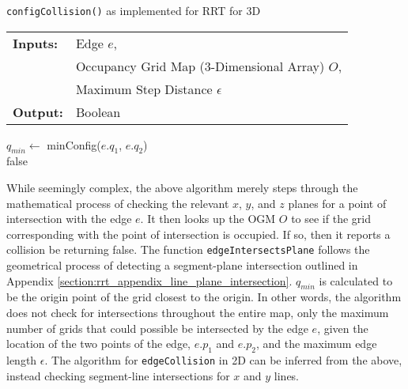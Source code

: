 \begin{algorithm}[t!]
    \caption{\texttt{configCollision()} as implemented for \gls{RRT} for 3D}
    \SetAlgoLined
    \begin{tabular}{l l}
    \textbf{Inputs:}    & Edge $e$,\\ 
                        & Occupancy Grid Map (3-Dimensional Array) $O$,\\ 
                        & Maximum Step Distance $\epsilon$ \\
    \textbf{Output:}    & Boolean \\
    \end{tabular}
    
        $q_{min} \leftarrow $ minConfig($e.q_1$, $e.q_2$) \\
        \Return false
\end{algorithm}

While seemingly complex, the above algorithm merely steps through the mathematical process of checking the relevant $x$, $y$, and $z$ planes for a point of intersection with the edge $e$. It then looks up the \gls{OGM} $O$ to see if the grid corresponding with the point of intersection is occupied. If so, then it reports a collision be returning false. The function \texttt{edgeIntersectsPlane} follows the geometrical process of detecting a segment-plane intersection outlined in Appendix \ref{section:rrt_appendix_line_plane_intersection}. $q_{min}$ is calculated to be the origin point of the grid closest to the origin. In other words, the algorithm does not check for intersections throughout the entire map, only the maximum number of grids that could possible be intersected by the edge $e$, given the location of the two points of the edge, $e.p_1$ and $e.p_2$, and the maximum edge length $\epsilon$. The algorithm for \texttt{edgeCollision} in \gls{2D} can be inferred from the above, instead checking segment-line intersections for $x$ and $y$ lines.